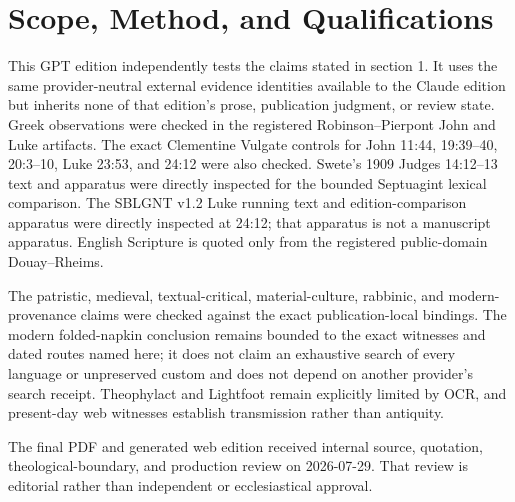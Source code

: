 \section{Scope, Method, and Qualifications}

This GPT edition independently tests the claims stated in section 1. It uses
the same provider-neutral external evidence identities available to the Claude
edition but inherits none of that edition's prose, publication judgment, or
review state. Greek observations were checked in the registered
Robinson--Pierpont John and Luke artifacts. The exact Clementine Vulgate
controls for John 11:44, 19:39--40, 20:3--10, Luke 23:53, and 24:12 were also
checked. Swete's 1909 Judges 14:12--13 text and apparatus were directly
inspected for the bounded Septuagint lexical comparison. The SBLGNT v1.2 Luke
running text and edition-comparison apparatus were directly inspected at
24:12; that apparatus is not a manuscript apparatus. English Scripture is
quoted only from the registered public-domain Douay--Rheims.

The patristic, medieval, textual-critical, material-culture, rabbinic, and
modern-provenance claims were checked against the exact publication-local
bindings. The modern folded-napkin conclusion remains bounded to the exact
witnesses and dated routes named here; it does not claim an exhaustive search
of every language or unpreserved custom and does not depend on another
provider's search receipt. Theophylact and Lightfoot remain explicitly limited
by OCR, and present-day web witnesses establish transmission rather than
antiquity.

The final PDF and generated web edition received internal source, quotation,
theological-boundary, and production review on 2026-07-29. That review is
editorial rather than independent or ecclesiastical approval.


